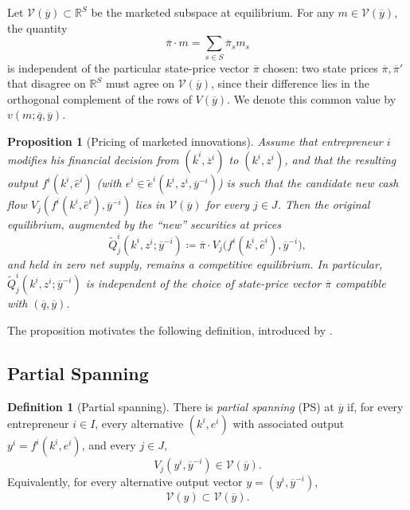 \documentclass[11pt,a4paper,oneside]{book}
\def\R{\mathbb{R}}
\theoremstyle{plain}
\newtheorem{proposition}[theorem]{Proposition}
\theoremstyle{definition}
\newtheorem{definition}[theorem]{Definition}
\theoremstyle{remark}
\numberwithin{equation}{chapter}
\begin{document}
Let $\mathcal{V}(\overline{y}) \subset \R^S$ be the marketed subspace at equilibrium.
For any $m \in \mathcal{V}(\overline{y})$, the quantity
\begin{equation*}
  \overline{\pi} \cdot m = \sum_{s \in S} \overline{\pi}_s m_s
\end{equation*}
is independent of the particular state-price vector $\overline{\pi}$ chosen: two state prices $\overline{\pi}, \overline{\pi}'$ that disagree on $\R^S$ must agree on $\mathcal{V}(\overline{y})$, since their difference lies in the orthogonal complement of the rows of $V(\overline{y})$.
We denote this common value by $v(m; \overline{q}, \overline{y})$.

\begin{proposition}[Pricing of marketed innovations]\label{prop:marketed-pricing}
Assume that entrepreneur $i$ modifies his financial decision from $(\overline{k}^i, \overline{z}^i)$ to $(k^i, z^i)$, and that the resulting output $f^i(k^i, \widehat{e}^i)$ (with $\widehat{e}^i \in \widetilde{e}^i(k^i, z^i, \overline{y}^{-i})$) is such that the candidate new cash flow $V_j(f^i(k^i, \widehat{e}^i), \overline{y}^{-i})$ lies in $\mathcal{V}(\overline{y})$ for every $j \in J$.
Then the original equilibrium, augmented by the ``new'' securities at prices
\begin{equation*}
  \widetilde{Q}^i_j(k^i, z^i; \overline{y}^{-i}) \coloneqq \overline{\pi} \cdot V_j\bigl( f^i(k^i, \widehat{e}^i), \overline{y}^{-i} \bigr),
\end{equation*}
and held in zero net supply, remains a competitive equilibrium.
In particular, $\widetilde{Q}^i_j(k^i, z^i; \overline{y}^{-i})$ is independent of the choice of state-price vector $\overline{\pi}$ compatible with $(\overline{q}, \overline{y})$.
\end{proposition}

The proposition motivates the following definition, introduced by \citet{MagillQuinzii2002}.

\subsection{Partial Spanning}

\begin{definition}[Partial spanning]\label{def:PS}
There is \emph{partial spanning} (PS) at $\overline{y}$ if, for every entrepreneur $i \in I$, every alternative $(k^i, e^i)$ with associated output $y^i = f^i(k^i, e^i)$, and every $j \in J$,
\begin{equation*}
  V_j(y^i, \overline{y}^{-i}) \in \mathcal{V}(\overline{y}).
\end{equation*}
Equivalently, for every alternative output vector $y = (y^i, \overline{y}^{-i})$,
\begin{equation}\label{eq:PS-spanning}
  \mathcal{V}(y) \subset \mathcal{V}(\overline{y}).
\end{equation}
\end{definition}
\end{document}
